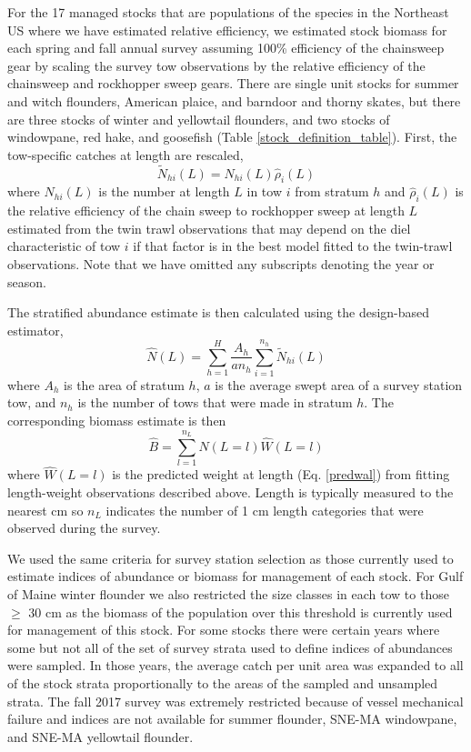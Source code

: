 \documentclass[
  12pt,
]{article}
\begin{document}
For the 17 managed stocks that are populations of the species in the
Northeast US where we have estimated relative efficiency, we estimated
stock biomass for each spring and fall annual survey assuming 100\%
efficiency of the chainsweep gear by scaling the survey tow observations
by the relative efficiency of the chainsweep and rockhopper sweep gears.
There are single unit stocks for summer and witch flounders, American
plaice, and barndoor and thorny skates, but there are three stocks of
winter and yellowtail flounders, and two stocks of windowpane, red hake,
and goosefish (Table \ref{stock_definition_table}). First, the
tow-specific catches at length are rescaled, \begin{equation}\label{nal}
\widetilde N_{hi}\left(L\right) = N_{hi}\left(L\right)\widehat \rho_i\left(L\right)
\end{equation} where \(N_{hi}(L)\) is the number at length \(L\) in tow
\(i\) from stratum \(h\) and \(\widehat \rho_i\left(L\right)\) is the
relative efficiency of the chain sweep to rockhopper sweep at length
\(L\) estimated from the twin trawl observations that may depend on the
diel characteristic of tow \(i\) if that factor is in the best model
fitted to the twin-trawl observations. Note that we have omitted any
subscripts denoting the year or season.

The stratified abundance estimate is then calculated using the
design-based estimator, \begin{equation}\label{Nal_estimate}
 \widehat N(L) = \sum^H_{h=1} \frac{A_h}{an_h}\sum^{n_h}_{i=1} \widetilde N_{hi}(L)
\end{equation} where \(A_h\) is the area of stratum \(h\), \(a\) is the
average swept area of a survey station tow, and \(n_h\) is the number of
tows that were made in stratum \(h\). The corresponding biomass estimate
is then \begin{equation}\label{biomass_estimate}
 \widehat B = \sum^{n_L}_{l=1} \widehat N(L = l) \widehat W(L=l)
\end{equation} where \(\widehat W(L=l)\) is the predicted weight at
length (Eq. \ref{predwal}) from fitting length-weight observations
described above. Length is typically measured to the nearest cm so
\(n_L\) indicates the number of 1 cm length categories that were
observed during the survey.

We used the same criteria for survey station selection as those
currently used to estimate indices of abundance or biomass for
management of each stock. For Gulf of Maine winter flounder we also
restricted the size classes in each tow to those \(\geq\) 30 cm as the
biomass of the population over this threshold is currently used for
management of this stock. For some stocks there were certain years where
some but not all of the set of survey strata used to define indices of
abundances were sampled. In those years, the average catch per unit area
was expanded to all of the stock strata proportionally to the areas of
the sampled and unsampled strata. The fall 2017 survey was extremely
restricted because of vessel mechanical failure and indices are not
available for summer flounder, SNE-MA windowpane, and SNE-MA yellowtail
flounder.
\end{document}
